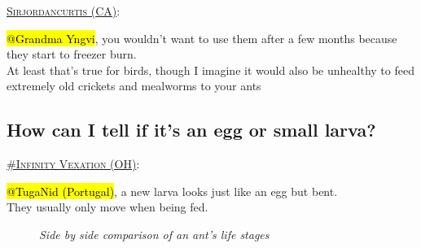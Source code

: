\noindent\textsc{\ul{Sirjordancurtis (CA)}}:

\begin{displayquote}
  \hl{@Grandma Yngvi}, you wouldn't want to use them after a few months because they start to freezer burn.
  \\At least that's true for birds, though I imagine it would also be unhealthy to feed extremely old crickets and mealworms to your ants
\end{displayquote}


\subsection{How can I tell if it's an egg or small larva?}

\noindent\textsc{\ul{\#Infinity Vexation (OH)}}:

\begin{displayquote}
  \hl{@TugaNid (Portugal)}, a new larva looks just like an egg but bent.
  \\They usually only move when being fed.
\end{displayquote}

\begin{figure}

\label{fig:ant-life-stages}


\caption{\textit{Side by side comparison of an ant's life stages}}
\end{figure}


